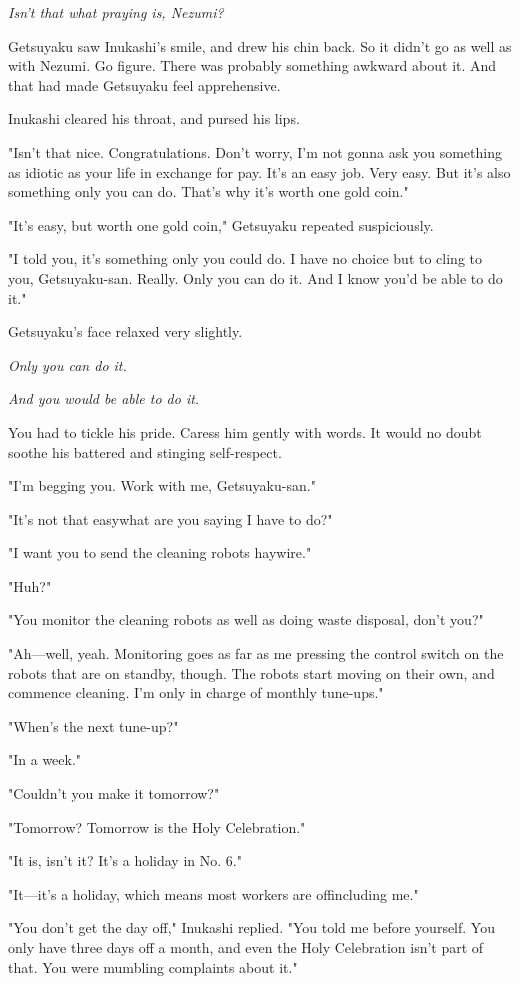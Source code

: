 \emph{Isn't that what praying is, Nezumi?}

Getsuyaku saw Inukashi's smile, and drew his chin back. So it didn't go
as well as with Nezumi. Go figure. There was probably something awkward
about it. And that had made Getsuyaku feel apprehensive.

Inukashi cleared his throat, and pursed his lips.

"Isn't that nice. Congratulations. Don't worry, I'm not gonna ask you
something as idiotic as your life in exchange for pay. It's an easy job.
Very easy. But it's also something only you can do. That's why it's
worth one gold coin."

"It's easy, but worth one gold coin," Getsuyaku repeated suspiciously.

"I told you, it's something only you could do. I have no choice but to
cling to you, Getsuyaku-san. Really. Only you can do it. And I know
you'd be able to do it."

Getsuyaku's face relaxed very slightly.

\emph{Only you can do it.}

\emph{And you \emph{would} be able to do it.}

You had to tickle his pride. Caress him gently with words. It would no
doubt soothe his battered and stinging self-respect.

"I'm begging you. Work with me, Getsuyaku-san."

"It's not that easy\el what are you saying I have to do?"

"I want you to send the cleaning robots haywire."

"Huh?"

"You monitor the cleaning robots as well as doing waste disposal, don't
you?"

"Ah---well, yeah. Monitoring goes as far as me pressing the control switch
on the robots that are on standby, though. The robots start moving on
their own, and commence cleaning. I'm only in charge of monthly
tune-ups."

"When's the next tune-up?"

"In a week."

"Couldn't you make it tomorrow?"

"Tomorrow? Tomorrow is the Holy Celebration."

"It is, isn't it? It's a holiday in No. 6."

"It---it's a holiday, which means most workers are off\el including me."

"You don't get the day off," Inukashi replied. "You told me before
yourself. You only have three days off a month, and even the Holy
Celebration isn't part of that. You were mumbling complaints about it."

